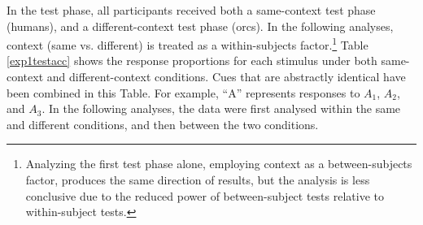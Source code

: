 \documentclass[twocolumn]{article}
\begin{document}
{In the test phase, all participants received both a same-context test phase (humans), and a different-context test phase (orcs). In the following analyses, context (same vs. different) is treated as a within-subjects factor.\footnote{Analyzing the first test phase alone, employing context as a between-subjects factor, produces the same direction of results, but the analysis is less conclusive due to the reduced power of between-subject tests relative to within-subject tests.}  Table \ref{exp1testacc} shows the response proportions for each stimulus under both same-context and different-context conditions. Cues that are abstractly identical have been combined in this Table. For example, ``A'' represents responses to  $A_{1}$, $A_{2}$, and $A_{3}$. In the following analyses, the data were first analysed within the same and different conditions, and then between the two conditions. 

}
\end{document}

